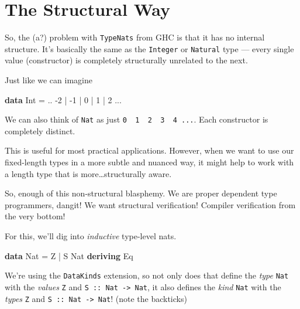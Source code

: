\documentclass[]{article}
\newenvironment{Shaded}{}{}
\newcommand{\KeywordTok}[1]{\textcolor[rgb]{0.00,0.44,0.13}{\textbf{#1}}}
\newcommand{\DataTypeTok}[1]{\textcolor[rgb]{0.56,0.13,0.00}{#1}}
\newcommand{\DecValTok}[1]{\textcolor[rgb]{0.25,0.63,0.44}{#1}}
\newcommand{\FunctionTok}[1]{\textcolor[rgb]{0.02,0.16,0.49}{#1}}
\begin{document}
\section{The Structural Way}\label{the-structural-way}

So, the (a?) problem with \texttt{TypeNats} from GHC is that it has no internal
structure. It's basically the same as the \texttt{Integer} or \texttt{Natural}
type --- every single value (constructor) is completely structurally unrelated
to the next.

Just like we can imagine

\begin{Shaded}
\begin{Highlighting}[]
\KeywordTok{data} \DataTypeTok{Int} \FunctionTok{=} \FunctionTok{..} \FunctionTok{-}\DecValTok{2} \FunctionTok{|} \FunctionTok{-}\DecValTok{1} \FunctionTok{|} \DecValTok{0} \FunctionTok{|} \DecValTok{1} \FunctionTok{|} \DecValTok{2} \FunctionTok{...}
\end{Highlighting}
\end{Shaded}

We can also think of \texttt{Nat} as just
\texttt{0\ \textbar{}\ 1\ \textbar{}\ 2\ \textbar{}\ 3\ \textbar{}\ 4\ ...}.
Each constructor is completely distinct.

This is useful for most practical applications. However, when we want to use our
fixed-length types in a more subtle and nuanced way, it might help to work with
a length type that is more\ldots{}structurally aware.

So, enough of this non-structural blasphemy. We are proper dependent type
programmers, dangit! We want structural verification! Compiler verification from
the very bottom!

For this, we'll dig into \emph{inductive} type-level nats.

\begin{Shaded}
\begin{Highlighting}[]
\KeywordTok{data} \DataTypeTok{Nat} \FunctionTok{=} \DataTypeTok{Z} \FunctionTok{|} \DataTypeTok{S} \DataTypeTok{Nat}
  \KeywordTok{deriving} \DataTypeTok{Eq}
\end{Highlighting}
\end{Shaded}

We're using the \texttt{DataKinds} extension, so not only does that define the
\emph{type} \texttt{Nat} with the \emph{values} \texttt{Z} and
\texttt{S\ ::\ Nat\ -\textgreater{}\ Nat}, it also defines the \emph{kind}
\texttt{Nat} with the \emph{types} \texttt{\textquotesingle{}Z} and
\texttt{\textquotesingle{}S\ ::\ Nat\ -\textgreater{}\ Nat}! (note the
backticks)
\end{document}
